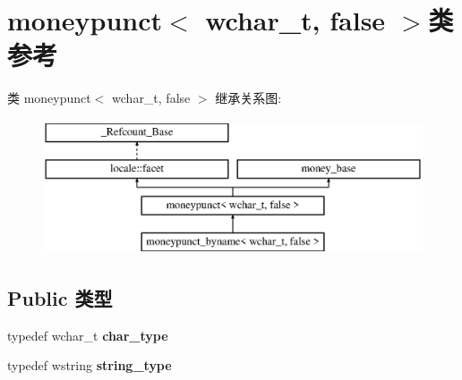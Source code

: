 \hypertarget{classmoneypunct_3_01wchar__t_00_01false_01_4}{}\section{moneypunct$<$ wchar\+\_\+t, false $>$类 参考}
\label{classmoneypunct_3_01wchar__t_00_01false_01_4}
类 moneypunct$<$ wchar\+\_\+t, false $>$ 继承关系图\+:\begin{figure}[H]
\begin{center}
\leavevmode
\includegraphics[height=4.000000cm]{classmoneypunct_3_01wchar__t_00_01false_01_4}
\end{center}
\end{figure}
\subsection*{Public 类型}
\begin{DoxyCompactItemize}
\item 
\mbox{\label{classmoneypunct_3_01wchar__t_00_01false_01_4_a04d88c924e5b028662b82b12d82262bd}} 
typedef wchar\+\_\+t {\bfseries char\+\_\+type}
\item 
\mbox{\label{classmoneypunct_3_01wchar__t_00_01false_01_4_aba00dd18eec6e3bffe370b0ec9a65e6f}} 
typedef wstring {\bfseries string\+\_\+type}
\end{DoxyCompactItemize}
